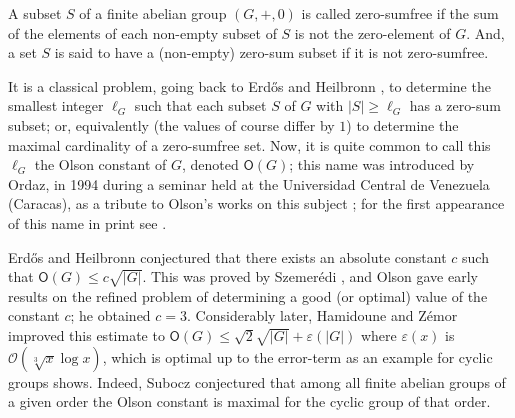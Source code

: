 \documentclass{amsart}
\theoremstyle{definition}
\numberwithin{equation}{section}
\begin{document}
A subset $S$ of a finite abelian group $(G,+,0)$ is called zero-sumfree
if the sum of the elements of each non-empty subset of $S$ is not the zero-element of $G$.
And, a set $S$ is said to have a (non-empty) zero-sum subset if it is not zero-sumfree.

It is a classical problem, going back to Erd\H{o}s and Heilbronn \cite{heilbronn}, to determine the smallest integer $\ell_{G}$ such that each subset $S$ of $G$ with $|S|\ge \ell_{G}$ has a zero-sum subset; or, equivalently (the values of course differ by $1$) to determine the maximal cardinality of a zero-sumfree set.
Now, it is quite common to call this $\ell_G$ the Olson constant of $G$, denoted ${\mathsf{O}}(G)$; this name was introduced
by Ordaz, in 1994 during a seminar held at the Universidad Central de Venezuela (Caracas), as a tribute to Olson's works on this subject \cite{o2,o1}; for the first appearance of this name in print see \cite{LRI}.

Erd\H{o}s and Heilbronn \cite{heilbronn} conjectured that there exists an absolute constant $c$ such that
${\mathsf{O}}(G)\le c \sqrt{|G|}$. This was proved by Szemer{\'e}di \cite{szemeredi}, and Olson \cite{o2} gave early results on the refined problem of determining a good (or optimal) value of the constant $c$; he obtained $c=3$.
Considerably later, Hamidoune and Z{\'e}mor \cite{H} improved this estimate
to ${\mathsf{O}}(G)\le \sqrt{2} \sqrt{|G|} + \varepsilon (|G|)$ where $\varepsilon(x)$ is $\mathcal{O}(\sqrt[3]{x}\log x)$, which is optimal up to the error-term as an example for cyclic groups shows.
Indeed, Subocz \cite{sub} conjectured that among all finite abelian groups of a given order the Olson constant is maximal for the cyclic group of that order.
\end{document}

